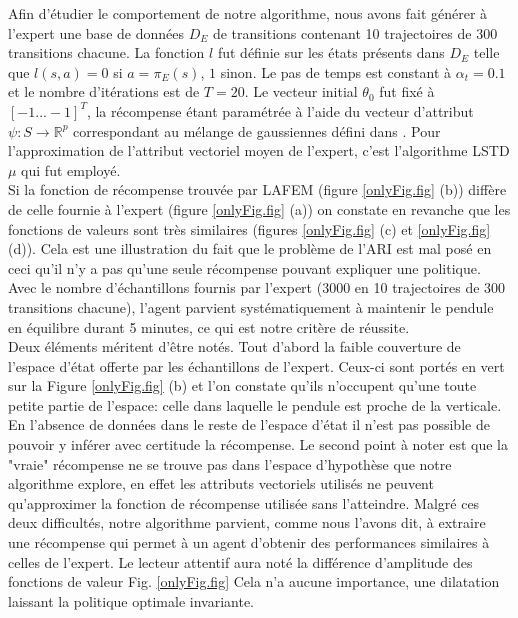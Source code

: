 \documentclass{article}
\begin{document}
Afin d'étudier le comportement de notre algorithme, nous avons fait générer à l'expert une base de données $D_E$ de transitions contenant 10 trajectoires de 300 transitions chacune.
La fonction $l$ fut définie sur les états présents dans $D_E$ telle que $l(s,a) = 0$ si $a=\pi_E(s)$, $1$ sinon. Le pas de temps est constant à $\alpha_t = 0.1$ et le nombre d'itérations
est de $T=20$. Le vecteur initial $\theta_0$ fut fixé à $[-1...-1]^T$, la récompense étant paramétrée à l'aide du vecteur d'attribut $\psi: S \rightarrow \mathbb{R}^p$ correspondant au mélange
de gaussiennes défini dans \cite{lagoudakis2003least}. Pour l'approximation de l'attribut vectoriel moyen de l'expert, c'est l'algorithme LSTD$\mu$ qui fut employé.\\

Si la fonction de récompense trouvée par LAFEM (figure \ref{onlyFig.fig} (b)) diffère de celle fournie à l'expert (figure \ref{onlyFig.fig} (a)) on constate en revanche que les fonctions de valeurs
sont très similaires (figures \ref{onlyFig.fig} (c) et \ref{onlyFig.fig} (d)). Cela est une illustration du fait que le problème de l'ARI est mal posé en ceci qu'il n'y a pas qu'une seule récompense
pouvant expliquer une politique.\\

Avec le nombre d'échantillons fournis par l'expert (3000 en 10 trajectoires de 300 transitions chacune), l'agent parvient systématiquement à maintenir le pendule en équilibre durant 5 minutes,
ce qui est notre critère de réussite.\\

Deux éléments méritent d'être notés. Tout d'abord la faible couverture de l'espace d'état offerte par les échantillons de l'expert.
Ceux-ci sont portés en vert sur la Figure \ref{onlyFig.fig} (b) et l'on constate qu'ils n'occupent qu'une toute petite partie de l'espace:
celle dans laquelle le pendule est proche de la verticale. En l'absence de données dans le reste de l'espace d'état il n'est pas possible de pouvoir y inférer avec certitude la récompense.
Le second point à noter est que la "vraie" récompense ne se trouve pas dans l'espace d'hypothèse que notre algorithme explore, en effet les attributs vectoriels utilisés ne peuvent qu'approximer
la fonction de récompense utilisée sans l'atteindre. Malgré ces deux difficultés, notre algorithme parvient, comme nous l'avons dit, à extraire une récompense qui permet à un agent d'obtenir
des performances similaires à celles de l'expert. Le lecteur attentif aura noté la différence d'amplitude des fonctions de valeur Fig. \ref{onlyFig.fig} Cela n'a aucune importance, une dilatation
laissant la politique optimale invariante.
\end{document}
